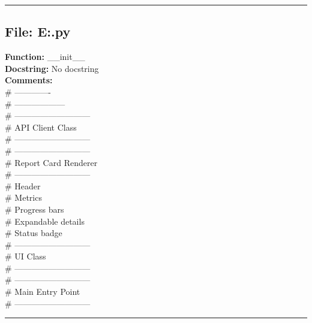{\hrule

\subsection*{File: E:\project\capstone\frontend\view.py}
\textbf{Function:} __init__\\
\textbf{Docstring:} No docstring\\
\textbf{Comments:}\\
# -------------\\
# ------------------\\
# ---------------------------\\
# API Client Class\\
# ---------------------------\\
# ---------------------------\\
# Report Card Renderer\\
# ---------------------------\\
# Header\\
# Metrics\\
# Progress bars\\
# Expandable details\\
# Status badge\\
# ---------------------------\\
# UI Class\\
# ---------------------------\\
# ---------------------------\\
# Main Entry Point\\
# ---------------------------\\

\hrule

}
